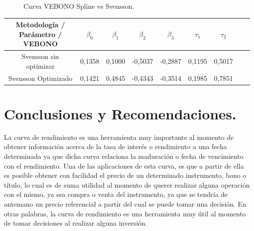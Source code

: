\newpage

\begin{figure}[h]
\caption{Curva VEBONO Spline vs Svensson.}
\label{curva_spline_comp_veb}
\end{figure}

\begin{center}
{\begin{tabular}[t]{|c |c |c |c |c |c |c |c |r|}
\hline
Metodolog\'ia / Par\'ametro / VEBONO & $\beta_{0}$ & $\beta_{1}$ & $\beta_{2}$ & $\beta_{3}$  &  $\tau_{1}$ & $\tau_{2}$ \\
\hline
Svensson sin optimizar & 0,1358 & 0,1000 & -0,5037 & -0,2887 & 0,1195 & 0,5017\\
\hline
Svensson Optimizado & 0,1421 & 0,4845 & -0,4343 & -0,3514 & 0,1985 & 0,7851 \\
\hline
\end{tabular}}
\end{center}


\newpage

\section{Conclusiones y Recomendaciones.}

\hspace{0.4cm}La curva de rendimiento es una herramienta muy importante al momento de obtener informaci\'on acerca de la tasa de inter\'es o rendimiento a una fecha determinada ya que dicha curva relaciona la maduraci\'on o fecha de vencimiento con el rendimiento. Una de las aplicaciones de esta curva, es que a partir de ella es posible obtener con facilidad el precio de un determinado instrumento, bono o t\'itulo, lo cual es de suma utilidad al momento de querer realizar alguna operaci\'on con el mismo, ya sea compra o venta del instrumento, ya que se tendr\'ia de antemano un precio referencial a partir del cual se puede tomar una decisi\'on. En otras palabras, la curva de rendimiento es una herramienta muy \'util al momento de tomar decisiones al realizar alguna inversi\'on.



